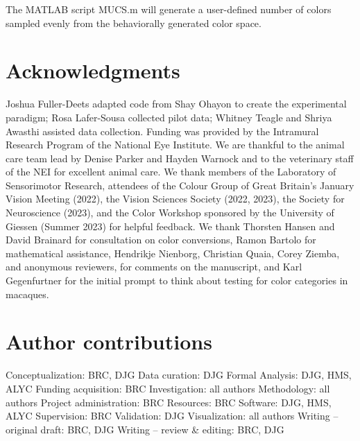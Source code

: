 \documentclass[9pt,biorxiv,lineno,onehalfspacing]{lapreprint}
\begin{document}
\begin{refsection}
The MATLAB script MUCS.m will generate a user-defined number of colors sampled evenly from the behaviorally generated color space.


\printbibliography%
\end{refsection}

\section{Acknowledgments}

Joshua Fuller-Deets adapted code from Shay Ohayon to create the experimental paradigm; Rosa Lafer-Sousa collected pilot data; Whitney Teagle and Shriya Awasthi assisted data collection. 
Funding was provided by the Intramural Research Program of the National Eye Institute. 
We are thankful to the animal care team lead by Denise Parker and Hayden Warnock and to the veterinary staff of the NEI for excellent animal care. 
We thank members of the Laboratory of Sensorimotor Research, attendees of the Colour Group of Great Britain’s January Vision Meeting (2022), the Vision Sciences Society (2022, 2023), the Society for Neuroscience (2023), and the Color Workshop sponsored by the University of Giessen (Summer 2023) for helpful feedback. 
We thank Thorsten Hansen and David Brainard for consultation on color conversions, Ramon Bartolo for mathematical assistance, Hendrikje Nienborg, Christian Quaia, Corey Ziemba, and anonymous reviewers, for comments on the manuscript, and Karl Gegenfurtner for the initial prompt to think about testing for color categories in macaques.

\section{Author contributions}


Conceptualization: BRC, DJG\newline
Data curation: DJG\newline
Formal Analysis: DJG, HMS, ALYC\newline
Funding acquisition: BRC\newline
Investigation: all authors\newline
Methodology: all authors\newline
Project administration: BRC\newline
Resources: BRC\newline
Software: DJG, HMS, ALYC\newline
Supervision: BRC\newline
Validation: DJG\newline
Visualization: all authors\newline
Writing – original draft: BRC, DJG\newline
Writing – review \& editing: BRC, DJG\newline
\end{document}
